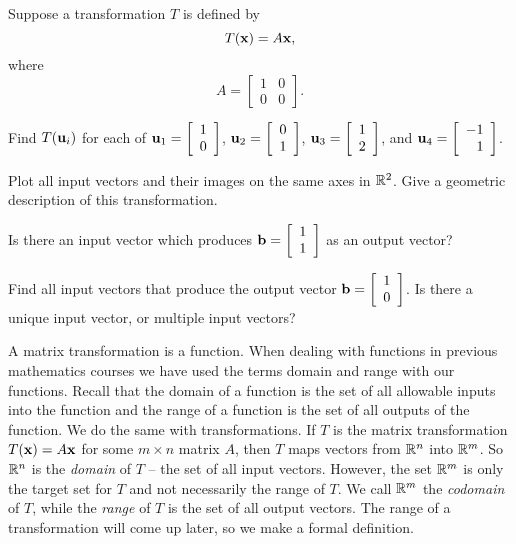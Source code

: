 \begin{pa}
	
\item Suppose a transformation $T$ is defined by 
\[T(\mathbf{x}) = A\mathbf{x},\]
where 
\[A = \left[ \begin{array}{cc} 1&0 \\ 0&0 \end{array} \right].\]
	\ba
	\item Find $T(\mathbf{u}_i)$ for each of $\mathbf{u}_1 = \left[ \begin{array}{c}  1 \\ 0 \end{array} \right]$, $\mathbf{u}_2 = \left[ \begin{array}{c}  0\\1 \end{array} \right]$, $\mathbf{u}_3 = \left[ \begin{array}{c} 1  \\ 2 \end{array} \right]$, and  $\mathbf{u}_4 = \left[ \begin{array}{r} -1  \\ 1 \end{array} \right]$. 


	\item Plot all input vectors and their images on the same axes in $\mathbb{R}^2$. Give a geometric description of this transformation.

	\item Is there an input vector which produces $\mathbf{b} = \left[ \begin{array}{c}  1 \\ 1 \end{array} \right]$ as an output vector?


	\item Find all input vectors that produce the output vector $\mathbf{b} = \left[ \begin{array}{c}  1 \\ 0 \end{array} \right]$. Is there a unique input vector, or multiple input vectors? 

	\ea
	

\ee
\end{pa}



A matrix transformation is a function. When dealing with functions in previous mathematics courses we have used the terms domain and range with our functions. Recall that the domain of a function is the set of all allowable inputs into the function and the range of a function is the set of all outputs of the function. We do the same with transformations. If $T$ is the matrix transformation $T(\mathbf{x}) = A \mathbf{x}$ for some $m \times n$ matrix $A$, then $T$ maps vectors from $\mathbb{R}^n$ into $\mathbb{R}^m$. So $\mathbb{R}^n$ is the \emph{domain} of $T$ -- the set of all input vectors. However, the set $\mathbb{R}^m$ is only the target set for $T$ and not necessarily the range of $T$.  We call $\mathbb{R}^m$ the \emph{codomain}  of $T$, while the \emph{range} of $T$ is the set of all output vectors. The range of a transformation will come up later, so we make a formal definition.

